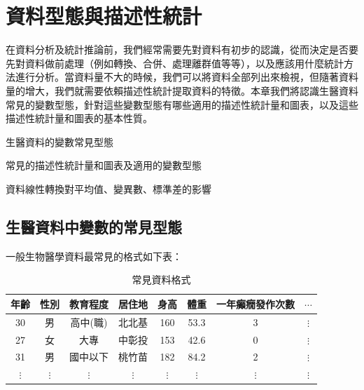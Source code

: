 \chapter{資料型態與描述性統計}
    在資料分析及統計推論前，我們經常需要先對資料有初步的認識，從而決定是否要先對資料做前處理（例如轉換、合併、處理離群值等等），以及應該用什麼統計方法進行分析。當資料量不大的時候，我們可以將資料全部列出來檢視，但隨著資料量的增大，我們就需要依賴描述性統計提取資料的特徵。本章我們將認識生醫資料常見的變數型態，針對這些變數型態有哪些適用的描述性統計量和圖表，以及這些描述性統計量和圖表的基本性質。
    
    \begin{introduction}
        \item 生醫資料的變數常見型態
        \item 常見的描述性統計量和圖表及適用的變數型態
        \item 資料線性轉換對平均值、變異數、標準差的影響
    \end{introduction}

\section{生醫資料中變數的常見型態}

    一般生物醫學資料最常見的格式如下表：

    \begin{table}[htbp]
        \begin{center}
            \begin{tabular}{cccccccc}
                \toprule
                年齡 & 性別 & 教育程度 & 居住地 & 身高 & 體重 & 一年癲癇發作次數 & $\cdots$\\
                \hline
                30 & 男 & 高中(職) & 北北基 & 160 & 53.3 & 3 & $\vdots$ \\
                27 & 女 & 大專 & 中彰投 & 153 & 42.6 & 0 & $\vdots$ \\
                31 & 男 & 國中以下 & 桃竹苗 & 182 & 84.2 & 2 & $\vdots$ \\
                $\vdots$ & $\vdots$ & $\vdots$ & $\vdots$ & $\vdots$ & $\vdots$ & $\vdots$ & $\vdots$ \\
                \bottomrule
            \end{tabular}
            \caption{常見資料格式\label{tab:data}}
        \end{center}
    \end{table}
        
